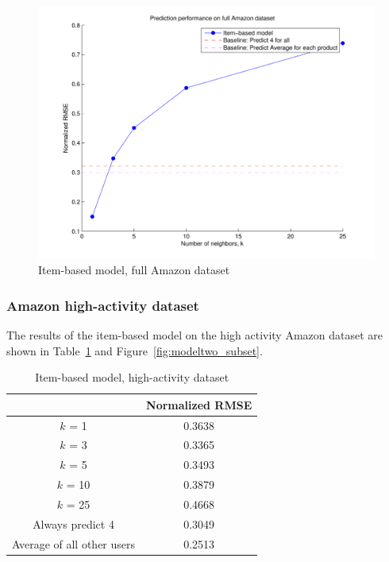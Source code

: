 \documentclass[letterpaper, 11 pt, conference]{ieeeconf}
\begin{document}
\begin{figure}[h]
\includegraphics[scale=0.5]{images/modeltwo_full.pdf}
\caption{Item-based model, full Amazon dataset}
\label{fig:modeltwo_full}
\end{figure}

\subsubsection{Amazon high-activity dataset}
The results of the item-based model on the high activity Amazon dataset 
are shown in Table~\ref{table:modeltwo_subset} and 
Figure~\ref{fig:modeltwo_subset}.

\begin{table}[htb]
\centering
\begin{tabular}{|c|c|}
\cline{2-2}

\multicolumn{1}{c|}{}  & {Normalized RMSE} \tabularnewline \hline
$k$ = 1 & 0.3638 \tabularnewline
$k$ = 3 & 0.3365 \tabularnewline
$k$ = 5 & 0.3493 \tabularnewline
$k$ = 10 & 0.3879 \tabularnewline
$k$ = 25 & 0.4668 \tabularnewline
\hline
Always predict 4 & 0.3049 \tabularnewline 
Average of all other users & 0.2513 \tabularnewline
\hline
\end{tabular}
\caption{Item-based model, high-activity dataset}
\label{table:modeltwo_subset}
\end{table}
\end{document}
